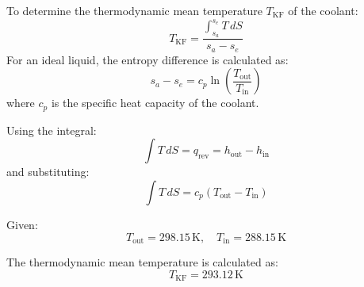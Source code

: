 To determine the thermodynamic mean temperature \( T_{\text{KF}} \) of the coolant:  
\[
T_{\text{KF}} = \frac{\int_{s_a}^{s_e} T \, dS}{s_a - s_e}
\]  
For an ideal liquid, the entropy difference is calculated as:  
\[
s_a - s_e = c_p \ln \left( \frac{T_{\text{out}}}{T_{\text{in}}} \right)
\]  
where \( c_p \) is the specific heat capacity of the coolant.  

Using the integral:  
\[
\int T \, dS = q_{\text{rev}} = h_{\text{out}} - h_{\text{in}}
\]  
and substituting:  
\[
\int T \, dS = c_p \left( T_{\text{out}} - T_{\text{in}} \right)
\]  

Given:  
\[
T_{\text{out}} = 298.15 \, \text{K}, \quad T_{\text{in}} = 288.15 \, \text{K}
\]  

The thermodynamic mean temperature is calculated as:  
\[
T_{\text{KF}} = 293.12 \, \text{K}
\]